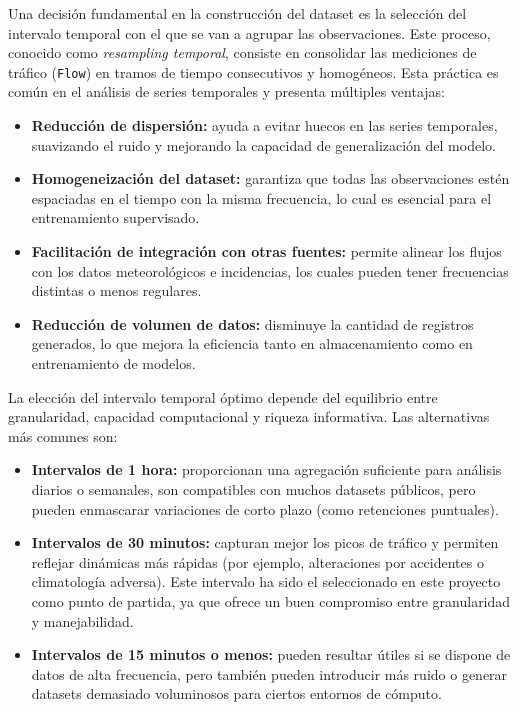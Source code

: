 Una decisión fundamental en la construcción del dataset es la selección del intervalo temporal con el que se van a agrupar las observaciones. Este proceso, conocido como \textit{resampling temporal}, consiste en consolidar las mediciones de tráfico (\texttt{Flow}) en tramos de tiempo consecutivos y homogéneos. Esta práctica es común en el análisis de series temporales y presenta múltiples ventajas:

\begin{itemize}
	\item \textbf{Reducción de dispersión:} ayuda a evitar huecos en las series temporales, suavizando el ruido y mejorando la capacidad de generalización del modelo.
	\item \textbf{Homogeneización del dataset:} garantiza que todas las observaciones estén espaciadas en el tiempo con la misma frecuencia, lo cual es esencial para el entrenamiento supervisado.
	\item \textbf{Facilitación de integración con otras fuentes:} permite alinear los flujos con los datos meteorológicos e incidencias, los cuales pueden tener frecuencias distintas o menos regulares.
	\item \textbf{Reducción de volumen de datos:} disminuye la cantidad de registros generados, lo que mejora la eficiencia tanto en almacenamiento como en entrenamiento de modelos.
\end{itemize}

\vspace{1em}
\noindent La elección del intervalo temporal óptimo depende del equilibrio entre granularidad, capacidad computacional y riqueza informativa. Las alternativas más comunes son:

\begin{itemize}
	\item \textbf{Intervalos de 1 hora:} proporcionan una agregación suficiente para análisis diarios o semanales, son compatibles con muchos datasets públicos, pero pueden enmascarar variaciones de corto plazo (como retenciones puntuales).
	
	\item \textbf{Intervalos de 30 minutos:} capturan mejor los picos de tráfico y permiten reflejar dinámicas más rápidas (por ejemplo, alteraciones por accidentes o climatología adversa). Este intervalo ha sido el seleccionado en este proyecto como punto de partida, ya que ofrece un buen compromiso entre granularidad y manejabilidad.
	
	\item \textbf{Intervalos de 15 minutos o menos:} pueden resultar útiles si se dispone de datos de alta frecuencia, pero también pueden introducir más ruido o generar datasets demasiado voluminosos para ciertos entornos de cómputo.
\end{itemize}

